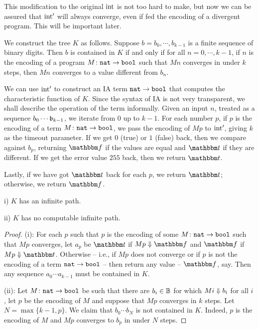 This modification to the original $\operatorname{int}$ is not too hard to make, but now we can be assured that $\operatorname{int}'$ will always converge, even if fed the encoding of a divergent program.  
This will be important later.

\begin{definition}
  We construct the tree $K$ as follows.  
  Suppose $b=b_0,\cdots,b_{k-1}$ is a finite sequence of binary digits.  
  Then $b$ is contained in $K$ if and only if for all $n=0,\cdots,k-1$, if $n$ is the encoding of a program $M\colon {\mathtt{nat}} \to {\mathtt{bool}}$ such that $M n$ converges in under $k$ steps, then $M n$ converges to a value different from $b_n$.  
\end{definition}

\begin{remark}
  We can use $\operatorname{int}'$ to construct an IA term ${\mathtt{nat}} \to {\mathtt{bool}}$ that computes the characteristic function of $K$.  
  Since the syntax of IA is not very transparent, we shall describe the operation of the term informally.  
  Given an input $n$, treated as a sequence $b_0 \cdots \mathfrak b_{k-1}$, we iterate from $0$ up to $k-1$.  
  For each number $p$, if $p$ is the encoding of a term $M \colon {\mathtt{nat}} \to {\mathtt{bool}}$, we pass the encoding of $M p$ to $\operatorname{int}'$, giving $k$ as the timeout parameter.  
  If we get $0$ (true) or $1$ (false) back, then we compare against $b_p$, returning $\false$ if the values are equal and $\true$ if they are different.  
  If we get the error value $255$ back, then we return $\true$.

  Lastly, if we have got $\true$ back for each $p$, we return $\true$; otherwise, we return $\false$.
\end{remark}

\begin{proposition}
  i) $K$ has an infinite path.

  ii) $K$ has no computable infinite path.
\end{proposition}
\begin{proof}
  (i): For each $p$ such that $p$ is the encoding of some $M \colon {\mathtt{nat}} \to {\mathtt{bool}}$ such that $M p$ converges, let $a_p$ be $\true$ if $M p \converges \false$ and $\false$ if $M p \converges \true$.  
  Otherwise -- i.e., if $M p$ does not converge or if $p$ is not the encoding of a term ${\mathtt{nat}} \to {\mathtt{bool}}$ -- then return any value -- $\false$, say.
  Then any sequence $a_0 \cdots a_{k-1}$ must be contained in $K$.

  (ii): Let $M \colon {\mathtt{nat}} \to {\mathtt{bool}}$ be such that there are $b_i\in\mathbb{B}$ for which $M i \Downarrow b_i$ for all $i$, let $p$ be the encoding of $M$ and suppose that $M p$ converges in $k$ steps.  
  Let $N=\max\{k-1,p\}$.
  We claim that $b_0\cdots b_{N}$ is not contained in $K$.  
  Indeed, $p$ is the encoding of $M$ and $M p$ converges to $b_p$ in under $N$ steps.
\end{proof}

